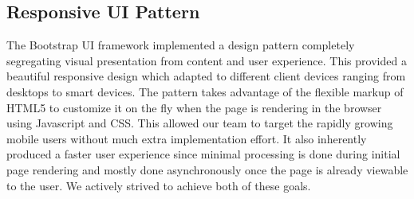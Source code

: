 \subsection{Responsive UI Pattern}
The Bootstrap UI framework implemented a design pattern completely segregating
visual presentation from content and user experience. This provided a beautiful
responsive design which adapted to different client devices ranging from
desktops to smart devices. The pattern takes advantage of the flexible markup of
HTML5 to customize it on the fly when the page is rendering in the browser using
Javascript and CSS. This allowed our team to target the rapidly growing mobile
users without much extra implementation effort. It also inherently produced a
faster user experience since minimal processing is done during initial page
rendering and mostly done asynchronously once the page is already viewable to
the user. We actively strived to achieve both of these goals.
